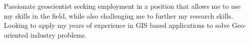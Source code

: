 %
%
%

\par{
    Passionate geoscientist seeking employment in a position that allows me to use my skills in the field, while also challenging me to further my research skills. Looking to apply my years of experience in GIS based applications to solve Geo-oriented industry problems.

}